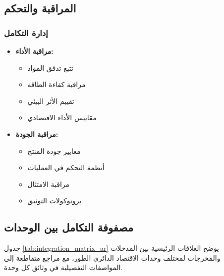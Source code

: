 \subsection{المراقبة والتحكم}

\subsubsection{إدارة التكامل}
\begin{itemize}
    \item \textbf{مراقبة الأداء:}
    \begin{itemize}
        \item تتبع تدفق المواد
        \item مراقبة كفاءة الطاقة
        \item تقييم الأثر البيئي
        \item مقاييس الأداء الاقتصادي
    \end{itemize}
    
    \item \textbf{مراقبة الجودة:}
    \begin{itemize}
        \item معايير جودة المنتج
        \item أنظمة التحكم في العمليات
        \item مراقبة الامتثال
        \item بروتوكولات التوثيق
    \end{itemize}
\end{itemize}

\subsection{مصفوفة التكامل بين الوحدات}

جدول \ref{tab:integration_matrix_ar} يوضح العلاقات الرئيسية بين المدخلات والمخرجات لمختلف وحدات الاقتصاد الدائري الطور، مع مراجع متقاطعة إلى المواصفات التفصيلية في وثائق كل وحدة.

